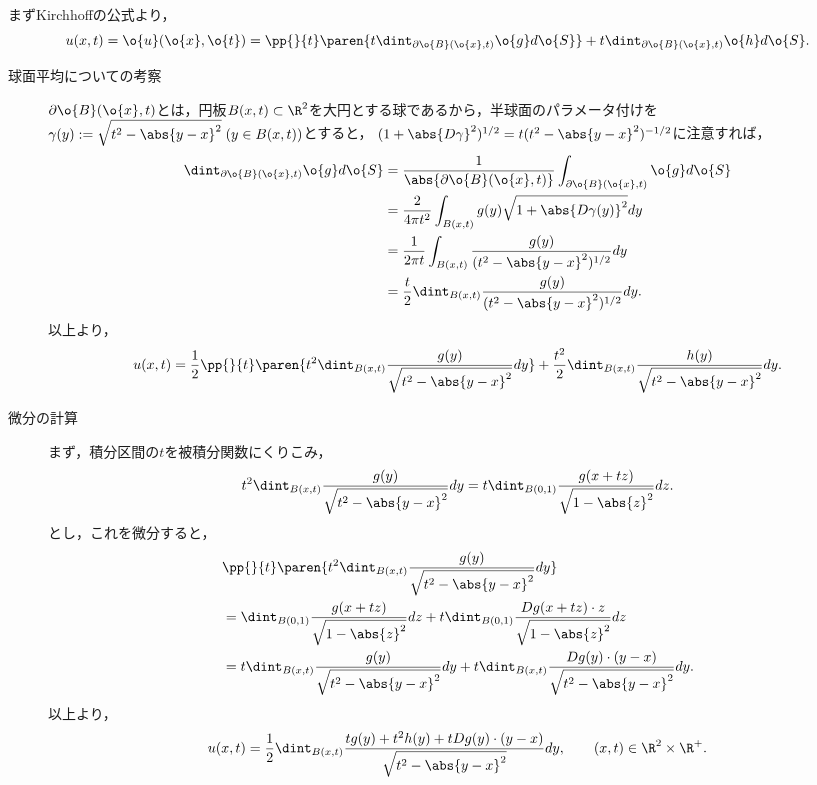 \documentclass[uplatex,dvipdfmx]{jsreport}
\begin{document}
\begin{observation}[Hadamardの降下法]
    まずKirchhoffの公式より，
    \[u(x,t)=\o{u}(\o{x},\o{t})=\pp{}{t}\paren{t\dint_{\partial\o{B}(\o{x},t)}\o{g}d\o{S}}+t\dint_{\partial\o{B}(\o{x},t)}\o{h}d\o{S}.\]
    \begin{description}
        \item[球面平均についての考察] $\partial\o{B}(\o{x},t)$とは，円板$B(x,t)\subset\R^2$を大円とする球であるから，半球面のパラメータ付けを$\gamma(y):=\sqrt{t^2-\abs{y-x}^2}\;(y\in B(x,t))$とすると，
        $(1+\abs{D\gamma}^2)^{1/2}=t(t^2-\abs{y-x}^2)^{-1/2}$に注意すれば，
        \begin{align*}
            \dint_{\partial\o{B}(\o{x},t)}\o{g}d\o{S}&=\frac{1}{\abs{\partial\o{B}(\o{x},t)}}\int_{\partial\o{B}(\o{x},t)}\o{g}d\o{S}\\
            &=\frac{2}{4\pi t^2}\int_{B(x,t)}g(y)\sqrt{1+\abs{D\gamma(y)}^2}dy\\
            &=\frac{1}{2\pi t}\int_{B(x,t)}\frac{g(y)}{(t^2-\abs{y-x}^2)^{1/2}}dy\\
            &=\frac{t}{2}\dint_{B(x,t)}\frac{g(y)}{(t^2-\abs{y-x}^2)^{1/2}}dy.
        \end{align*}
        以上より，
        \[u(x,t)=\frac{1}{2}\pp{}{t}\paren{t^2\dint_{B(x,t)}\frac{g(y)}{\sqrt{t^2-\abs{y-x}^2}}dy}+\frac{t^2}{2}\dint_{B(x,t)}\frac{h(y)}{\sqrt{t^2-\abs{y-x}^2}}dy.\]
        \item[微分の計算] まず，積分区間の$t$を被積分関数にくりこみ，
        \[t^2\dint_{B(x,t)}\frac{g(y)}{\sqrt{t^2-\abs{y-x}^2}}dy=t\dint_{B(0,1)}\frac{g(x+tz)}{\sqrt{1-\abs{z}^2}}dz.\]
        とし，これを微分すると，
        \begin{align*}
            &\pp{}{t}\paren{t^2\dint_{B(x,t)}\frac{g(y)}{\sqrt{t^2-\abs{y-x}^2}}dy}\\
            &=\dint_{B(0,1)}\frac{g(x+tz)}{\sqrt{1-\abs{z}^2}}dz+t\dint_{B(0,1)}\frac{Dg(x+tz)\cdot z}{\sqrt{1-\abs{z}^2}}dz\\
            &=t\dint_{B(x,t)}\frac{g(y)}{\sqrt{t^2-\abs{y-x}^2}}dy+t\dint_{B(x,t)}\frac{Dg(y)\cdot(y-x)}{\sqrt{t^2-\abs{y-x}^2}}dy.
        \end{align*}
        以上より，
        \[u(x,t)=\frac{1}{2}\dint_{B(x,t)}\frac{tg(y)+t^2h(y)+tDg(y)\cdot(y-x)}{\sqrt{t^2-\abs{y-x}^2}}dy,\qquad(x,t)\in\R^2\times\R^+.\]
    \end{description}
\end{observation}
\end{document}
